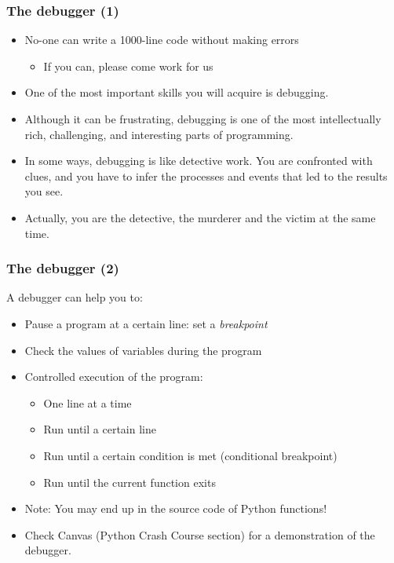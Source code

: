 \begin{frame}
\frametitle{The debugger (1)}
\begin{itemize}
   \item No-one can write a 1000-line code without making errors
  \begin{itemize}
     \item If you can, please come work for us
  \end{itemize}
   \item One of the most important skills you will acquire is debugging.
   \item Although it can be frustrating, debugging is one of the most intellectually rich, challenging, and interesting parts of programming.
   \item In some ways, debugging is like detective work. You are confronted with clues, and you have to infer the processes and events that led to the results you see.
   \item Actually, you are the detective, the murderer and the victim at the same time.
\end{itemize}
\end{frame}

\begin{frame}
  \frametitle{The debugger (2)}
A debugger can help you to:
\begin{itemize}
  \item Pause a program at a certain line: set a \emph{breakpoint}
  \item Check the values of variables during the program
  \item Controlled execution of the program:
  \begin{itemize}
    \item One line at a time
    \item Run until a certain line
    \item Run until a certain condition is met (conditional breakpoint)
    \item Run until the current function exits
  \end{itemize}
  \item Note: You may end up in the source code of Python functions!
  \item Check Canvas (Python Crash Course section) for a demonstration of the debugger.
\end{itemize}
\end{frame}

